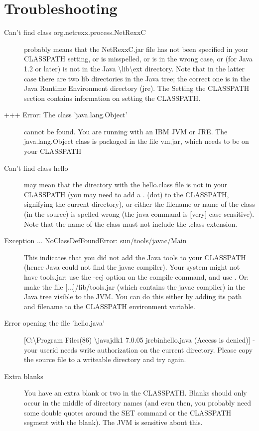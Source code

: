 \chapter{Troubleshooting\label{troubleshooting}}
\begin{description} 
\item[Can't find class org.netrexx.process.NetRexxC]
  probably means that the NetRexxC.jar file has not been specified in
  your CLASSPATH setting, or is misspelled, or is in the wrong case,
  or (for Java 1.2 or later) is not in the Java
  \textbackslash lib\textbackslash ext directory. Note that in the latter case there are two lib directories in the Java tree; the correct one is in the Java Runtime Environment directory (jre).
The Setting the CLASSPATH section contains information on setting the CLASSPATH.
\item[+++ Error: The class 'java.lang.Object'] cannot be found. You are running with an IBM JVM or JRE. The java.lang.Object class is packaged in the file vm.jar, which needs to be on your CLASSPATH
\item[Can't find class hello] may mean that the directory with the hello.class file is not in your CLASSPATH (you may need to add a . (dot) to the CLASSPATH, signifying the current directory), or either the filename or name of the class (in the source) is spelled wrong (the java command is [very] case-sensitive). Note that the name of the class must not include the .class extension.
\item[Exception ... NoClassDefFoundError: sun/tools/javac/Main] This indicates that you did not add the Java tools to your CLASSPATH (hence Java could not find the javac compiler). Your system might not have tools.jar: use the -ecj option on the compile command, and use . Or: make the file [...]/lib/tools.jar (which contains the javac compiler) in the Java tree visible to the JVM. You can do this either by adding its path and filename to the CLASSPATH environment variable.
\item[Error opening the file 'hello.java'][C:\textbackslash Program Files(86) \textbackslash javajdk1 7.0.05 jrebinhello.java (Access is denied)] - your userid needs write authorization on the current directory. Please copy the source file to a writeable directory and try again.
\item[Extra blanks] You have an extra blank or two in the CLASSPATH. Blanks should only occur in the middle of directory names (and even then, you probably need some double quotes around the SET command or the CLASSPATH segment with the blank). The JVM is sensitive about this.

\end{description}
